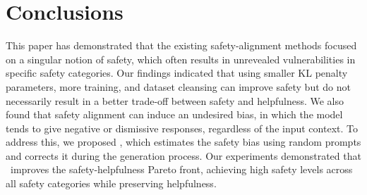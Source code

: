 \section{Conclusions}
This paper has demonstrated that the existing safety-alignment methods focused on a singular notion of safety, which often results in unrevealed vulnerabilities in specific safety categories. Our findings indicated that using smaller KL penalty parameters, more training, and dataset cleansing can improve safety but do not necessarily result in a better trade-off between safety and helpfulness. We also found that safety alignment can induce an undesired bias, in which the model tends to give negative or dismissive responses, regardless of the input context. To address this, we proposed \algoshort, which estimates the safety bias using random prompts and corrects it during the generation process. Our experiments demonstrated that \algoshort~improves the safety-helpfulness Pareto front, achieving high safety levels across all safety categories while preserving helpfulness.